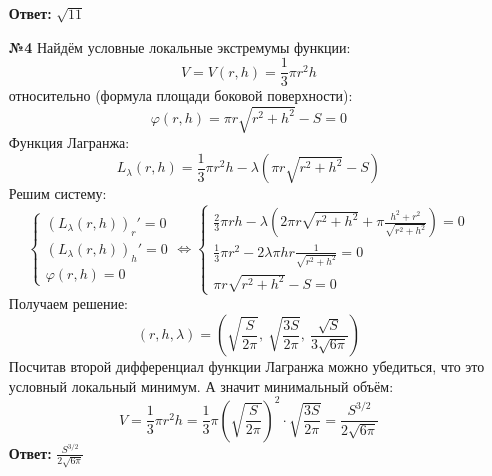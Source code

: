 \documentclass[a4paper]{article}
\renewcommand{\f}[2]{\frac{#1}{#2}}
\newcommand{\case}[1]{\begin{cases} #1 \end{cases}}
\renewcommand{\phi}{\varphi}
\newcommand{\lr}{\Leftrightarrow}
\renewcommand{\l}{\left(}
\renewcommand{\r}{\right)}
\begin{document}
\begin{enumerate}
    \textbf{Ответ:} $\sqrt{11}$\\

    \item[\textbf{№4}]Найдём условные локальные экстремумы функции:
    $$V = V(r, h) = \f{1}{3}\pi r^2 h$$
    относительно (формула площади боковой поверхности):
    $$\phi(r, h) = \pi r \sqrt{r^2+h^2} - S =0$$
    Функция Лагранжа:
    $$L_\lambda(r, h) = \f{1}{3}\pi r^2 h - \lambda(\pi r \sqrt{r^2+h^2} - S)$$
    Решим систему:
    $$\case{
        (L_\lambda(r, h))_r' = 0\\
        (L_\lambda(r, h))_h' = 0\\
        \phi(r, h) = 0
    } \lr \case{
        \frac{2}{3} \pi r h - \lambda \left( 2\pi r \sqrt{r^2 + h^2} + \pi \frac{h^2 + r^2}{\sqrt{r^2 + h^2}} \right) = 0\\
        \frac{1}{3} \pi r^2 - 2\lambda \pi h r \frac{1}{\sqrt{r^2 + h^2}}=0\\
        \pi r \sqrt{r^2+h^2} - S =0
    }$$
    Получаем решение:
    $$(r, h, \lambda) = \left( \sqrt{\dfrac{S}{2\pi}},\ \sqrt{\dfrac{3S}{2\pi}},\ \dfrac{\sqrt{S}}{3\sqrt{6\pi}} \right)$$
    Посчитав второй дифференциал функции Лагранжа можно убедиться, что это условный локальный минимум. 
    А значит минимальный объём:
    $$V = \f{1}{3}\pi r^2 h =  \f{1}{3}\pi \l{ \sqrt{\dfrac{S}{2\pi}}}\r^2 \cdot \sqrt{\dfrac{3S}{2\pi}} =
      \frac{S^{3/2}}{2\sqrt{6\pi}}$$
    \textbf{Ответ:} $\frac{S^{3/2}}{2\sqrt{6\pi}}$
\end{enumerate}
\end{document}
